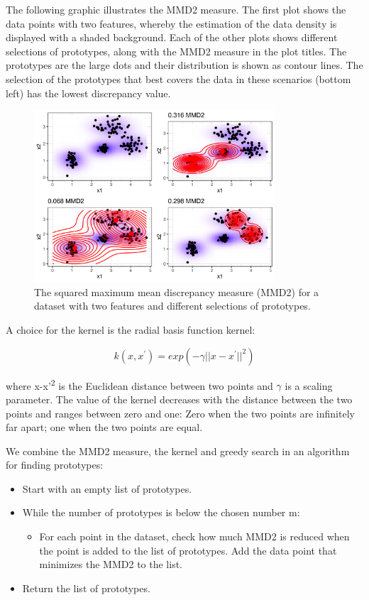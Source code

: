 \documentclass[
  10pt,
]{scrbook}
\providecommand{\tightlist}{%
  \setlength{\itemsep}{0pt}\setlength{\parskip}{0pt}}
\begin{document}
The following graphic illustrates the MMD2 measure.
The first plot shows the data points with two features, whereby the estimation of the data density is displayed with a shaded background.
Each of the other plots shows different selections of prototypes, along with the MMD2 measure in the plot titles.
The prototypes are the large dots and their distribution is shown as contour lines.
The selection of the prototypes that best covers the data in these scenarios (bottom left) has the lowest discrepancy value.

\begin{figure}

{\centering \includegraphics[width=0.8\textwidth]{images/mmd-1} 

}

\caption{The squared maximum mean discrepancy measure (MMD2) for a dataset with two features and different selections of prototypes.}\label{fig:mmd}
\end{figure}

A choice for the kernel is the radial basis function kernel:

\[k(x,x^\prime)=exp\left(-\gamma||x-x^\prime||^2\right)\]

where \textbar\textbar x-x'\textbar\textbar{}\textsuperscript{2} is the Euclidean distance between two points and \(\gamma\) is a scaling parameter.
The value of the kernel decreases with the distance between the two points and ranges between zero and one:
Zero when the two points are infinitely far apart;
one when the two points are equal.

We combine the MMD2 measure, the kernel and greedy search in an algorithm for finding prototypes:

\begin{itemize}
\tightlist
\item
  Start with an empty list of prototypes.
\item
  While the number of prototypes is below the chosen number m:

  \begin{itemize}
  \tightlist
  \item
    For each point in the dataset, check how much MMD2 is reduced when the point is added to the list of prototypes. Add the data point that minimizes the MMD2 to the list.
  \end{itemize}
\item
  Return the list of prototypes.
\end{itemize}
\end{document}
